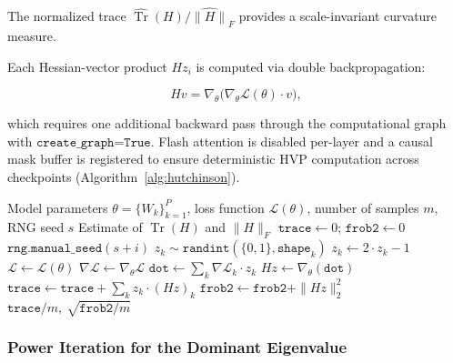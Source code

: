 \documentclass[12pt,twoside]{article}
\newcommand{\Tr}{\operatorname{Tr}}
\begin{document}
The normalized trace \(\widehat{\Tr}(H) / \widehat{\|H\|}_F\) provides a
scale-invariant curvature measure.

Each Hessian-vector product \(H z_i\) is computed via double backpropagation:

\begin{equation}
  H v = \nabla_\theta \big( \nabla_\theta \mathcal{L}(\theta) \cdot v \big),
  \label{eq:hvp}
\end{equation}

which requires one additional backward pass through the computational graph
with \(\texttt{create\_graph=True}\). Flash attention is disabled per-layer
and a causal mask buffer is registered to ensure deterministic HVP computation
across checkpoints (Algorithm~\ref{alg:hutchinson}).

\begin{algorithm}[t]
  \caption{Hutchinson trace estimation with HVP}
  \label{alg:hutchinson}
  \begin{algorithmic}[1]
    \Require Model parameters \(\theta = \{W_k\}_{k=1}^P\), loss function
    \(\mathcal{L}(\theta)\), number of samples \(m\), RNG seed \(s\)
    \Ensure Estimate of \(\Tr(H)\) and \(\|H\|_F\)
    \State \(\texttt{trace} \gets 0\); \(\texttt{frob2} \gets 0\)
      \State \(\texttt{rng}.\texttt{manual\_seed}(s + i)\)
      \State \(z_k \sim \texttt{randint}(\{0,1\}, \texttt{shape}_k)\)
      \State \(z_k \gets 2 \cdot z_k - 1\) 
      \State \(\mathcal{L} \gets \mathcal{L}(\theta)\)
      \State \(\nabla\mathcal{L} \gets \nabla_\theta \mathcal{L}\)
      \State \(\texttt{dot} \gets \sum_k \nabla\mathcal{L}_k \cdot z_k\)
      \State \(H z \gets \nabla_\theta(\texttt{dot})\)
      \State \(\texttt{trace} \gets \texttt{trace} + \sum_k z_k \cdot (H z)_k\)
      \State \(\texttt{frob2} \gets \texttt{frob2} + \|H z\|_2^2\)
    \EndFor
    \State \Return \(\texttt{trace}/m,\ \sqrt{\texttt{frob2}/m}\)
  \end{algorithmic}
\end{algorithm}

\subsubsection{Power Iteration for the Dominant Eigenvalue}
\end{document}
